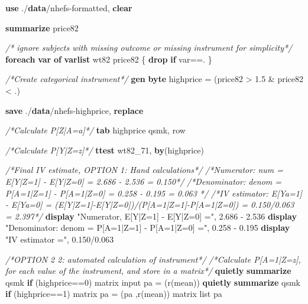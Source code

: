 \documentclass[
  10pt,
]{book}
\newenvironment{Shaded}{\begin{snugshade}}{\end{snugshade}}
\newcommand{\CommentTok}[1]{\textcolor[rgb]{0.56,0.35,0.01}{\textit{#1}}}
\newcommand{\FunctionTok}[1]{\textcolor[rgb]{0.00,0.00,0.00}{#1}}
\newcommand{\KeywordTok}[1]{\textcolor[rgb]{0.13,0.29,0.53}{\textbf{#1}}}
\newcommand{\NormalTok}[1]{#1}
\newcommand{\OtherTok}[1]{\textcolor[rgb]{0.56,0.35,0.01}{#1}}
\newcommand{\StringTok}[1]{\textcolor[rgb]{0.31,0.60,0.02}{#1}}
\begin{document}
\begin{Shaded}
\begin{Highlighting}[]
\KeywordTok{use}\NormalTok{ ./}\KeywordTok{data}\NormalTok{/nhefs{-}formatted, }\KeywordTok{clear}

\KeywordTok{summarize}\NormalTok{ price82}

\CommentTok{/* ignore subjects with missing outcome or missing instrument for simplicity*/}
\KeywordTok{foreach} \KeywordTok{var} \KeywordTok{of} \KeywordTok{varlist}\NormalTok{ wt82 price82 \{}
  \KeywordTok{drop} \KeywordTok{if} \OtherTok{\textasciigrave{}var\textquotesingle{}}\NormalTok{==.}
\NormalTok{\}}

\CommentTok{/*Create categorical instrument*/}
\KeywordTok{gen} \KeywordTok{byte}\NormalTok{ highprice = (price82 \textgreater{} 1.5 \& price82 \textless{} .)}

\KeywordTok{save}\NormalTok{ ./}\KeywordTok{data}\NormalTok{/nhefs{-}highprice, }\KeywordTok{replace}

\CommentTok{/*Calculate P[Z|A=a]*/}
\KeywordTok{tab}\NormalTok{ highprice qsmk, }\OtherTok{row}

\CommentTok{/*Calculate P[Y|Z=z]*/}
\KeywordTok{ttest}\NormalTok{ wt82\_71, }\KeywordTok{by}\NormalTok{(highprice)}

\CommentTok{/*Final IV estimate, OPTION 1: Hand calculations*/}
\CommentTok{/*Numerator: num = E[Y|Z=1] {-} E[Y|Z=0] = 2.686 {-} 2.536 = 0.150*/}
\CommentTok{/*Denominator: denom = P[A=1|Z=1] {-} P[A=1|Z=0] = 0.258 {-} 0.195 = 0.063 */} 
\CommentTok{/*IV estimator: E[Ya=1] {-} E[Ya=0] = (E[Y|Z=1]{-}E[Y|Z=0])/(P[A=1|Z=1]{-}P[A=1|Z=0]) = 0.150/0.063 = 2.397*/}
\KeywordTok{display} \StringTok{"Numerator, E[Y|Z=1] {-} E[Y|Z=0] ="}\NormalTok{, 2.686 {-} 2.536}
\KeywordTok{display} \StringTok{"Denominator: denom = P[A=1|Z=1] {-} P[A=1|Z=0] ="}\NormalTok{, 0.258 {-} 0.195}
\KeywordTok{display} \StringTok{"IV estimator ="}\NormalTok{, 0.150/0.063}

\CommentTok{/*OPTION 2 2: automated calculation of instrument*/}
\CommentTok{/*Calculate P[A=1|Z=z], for each value of the instrument, }
\CommentTok{and store in a matrix*/}
\KeywordTok{quietly} \KeywordTok{summarize}\NormalTok{ qsmk }\KeywordTok{if}\NormalTok{ (highprice==0)}
\FunctionTok{matrix}\NormalTok{ input pa = (}\OtherTok{\textasciigrave{}r(mean)\textquotesingle{}}\NormalTok{)}
\KeywordTok{quietly} \KeywordTok{summarize}\NormalTok{ qsmk }\KeywordTok{if}\NormalTok{ (highprice==1)}
\FunctionTok{matrix}\NormalTok{ pa = (pa ,}\OtherTok{\textasciigrave{}r(mean)\textquotesingle{}}\NormalTok{)}
\FunctionTok{matrix} \OtherTok{list}\NormalTok{ pa}


\end{Highlighting}
\end{Shaded}
\end{document}
